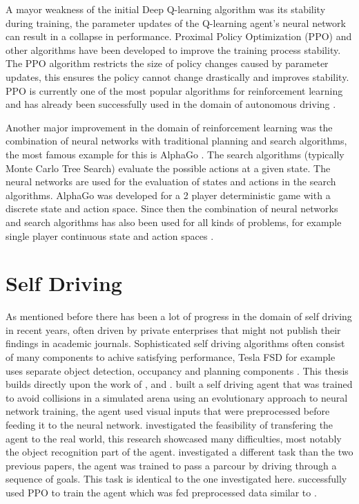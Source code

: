 A mayor weakness of the initial Deep Q-learning algorithm was its stability during training, the parameter updates of the Q-learning agent's neural network can result in a collapse in performance. Proximal Policy Optimization (PPO) and other algorithms have been developed to improve the training process stability. The PPO \autocite{ppo} algorithm restricts the size of policy changes caused by parameter updates, this ensures the policy cannot change drastically and improves stability. PPO is currently one of the most popular algorithms for reinforcement learning and has already been successfully used in the domain of autonomous driving \autocite{maximilian}.


Another major improvement in the domain of reinforcement learning was the combination of neural networks with traditional planning and search algorithms, the most famous example for this is AlphaGo \autocite{alphago}. The search algorithms (typically Monte Carlo Tree Search) evaluate the possible actions at a given state. The neural networks are used for the evaluation of states and actions in the search algorithms. AlphaGo was developed for a 2 player deterministic game with a discrete state and action space. Since then the combination of neural networks and search algorithms has also been used for all kinds of problems, for example single player continuous state and action spaces \autocite{alphagoimprovementmuzero}.




\section{Self Driving}

As mentioned before there has been a lot of progress in the domain of self driving in recent years, often driven by private enterprises that might not publish their findings in academic journals. Sophisticated self driving algorithms often consist of many components to achive satisfying performance, Tesla FSD for example uses separate object detection, occupancy and planning components \autocite{teslaEndToEnd}.
This thesis builds directly upon the work of \autocite{jonas_koenig}, \autocite{merlin_flach} and \autocite{maximilian}. \autocite{jonas_koenig} built a self driving agent that was trained to avoid collisions in a simulated arena using an evolutionary approach to neural network training, the agent used visual inputs that were preprocessed before feeding it to the neural network. \autocite{merlin_flach} investigated the feasibility of transfering the agent to the real world, this research showcased many difficulties, most notably the object recognition part of the agent. \autocite{maximilian} investigated a different task than the two previous papers, the agent was trained to pass a parcour by driving through a sequence of goals. This task is identical to the one investigated here. \autocite{maximilian} successfully used PPO to train the agent which was fed preprocessed data similar to \autocite{jonas_koenig}.

